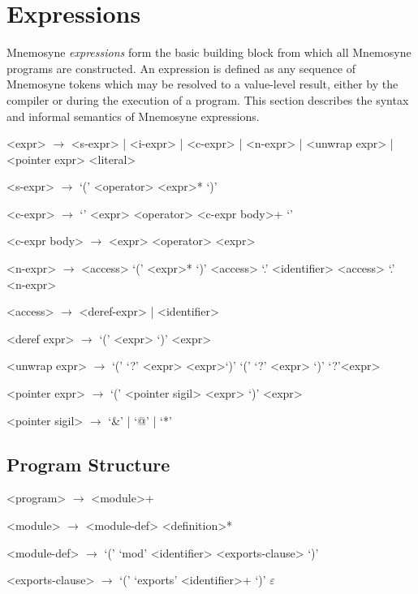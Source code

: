 \section{Expressions}\label{sec:expr}

Mnemosyne \textit{expressions} form the basic building block from which all Mnemosyne programs are constructed. An expression is defined as any sequence of Mnemosyne tokens which may be resolved to a value-level result, either by the compiler or during the execution of a program. This section describes the syntax and informal semantics of Mnemosyne expressions.

\begin{grammar}
    <expr> $\to$ <s-expr> | <i-expr> | <c-expr> | <n-expr>
             | <unwrap expr> | <pointer expr>
            \alt <literal>

    <s-expr> $\to$ `(' <operator>  <expr>* `)'

    <c-expr> $\to$ `{' <expr> <operator> <c-expr body>+ `}'

    <c-expr body> $\to$ <expr> <operator>
                   \alt <expr>

    <n-expr> $\to$ <access> `(' <expr>* `)'
              \alt <access> `.' <identifier>
              \alt <access> `.' <n-expr>

    <access> $\to$ <deref-expr> | <identifier>

    <deref expr> $\to$ `(' \lit{\$} <expr> `)'
                  \alt \lit{\$} <expr>

    <unwrap expr> $\to$ `(' `?' <expr> <expr>`)'
                   \alt `(' `?' <expr> `)'
                   \alt `?'<expr>

    <pointer expr> $\to$ `(' <pointer sigil> <expr> `)'
                     <expr>

    <pointer sigil> $\to$ `&' | `@' | `*'
\end{grammar}

\subsection{Program Structure}

\begin{grammar}
<program> $\to$ <module>+

<module> $\to$ <module-def> <definition>*

<module-def> $\to$ `(' `mod' <identifier> <exports-clause> `)'

<exports-clause> $\to$ `(' `exports' <identifier>+ `)'
                \alt $\varepsilon$


\end{grammar}

